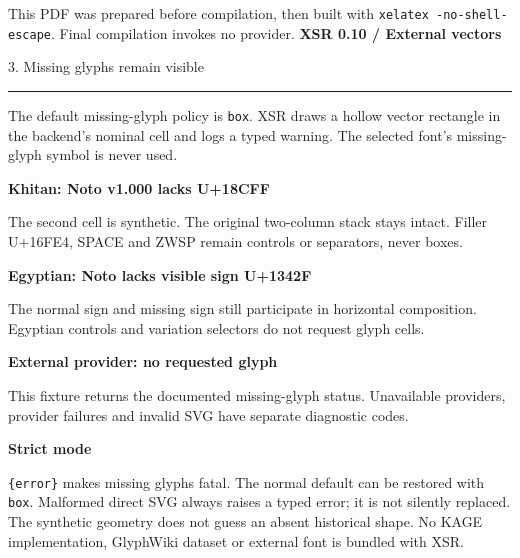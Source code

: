 \documentclass[11pt,a4paper]{article}
\newcommand\PageTitle[1]{{\color{ink}\LARGE\bfseries XSR 0.10 / External vectors}\par
  {\color{accent}\large #1}\par\medskip\hrule\medskip}
\newcommand\Sample[2]{\par\medskip\textbf{#1}\par\medskip {\fontsize{30}{40}\selectfont #2}\par\medskip}
\begin{document}
\vfill
\small This PDF was prepared before compilation, then built with
\texttt{xelatex -no-shell-escape}. Final compilation invokes no provider.
\newpage
\PageTitle{3. Missing glyphs remain visible}
The default missing-glyph policy is \texttt{box}. XSR draws a hollow vector
rectangle in the backend's nominal cell and logs a typed warning.
The selected font's missing-glyph symbol is never used.
\Sample{Khitan: Noto v1.000 lacks U+18CFF}{\xsrKhitanText{𘬁𘳿}}
The second cell is synthetic. The original two-column stack stays intact.
Filler U+16FE4, SPACE and ZWSP remain controls or separators, never boxes.
\Sample{Egyptian: Noto lacks visible sign U+1342F}{\xsrEgyptianText{𓀀𓐱𓐯}}
The normal sign and missing sign still participate in horizontal composition.
Egyptian controls and variation selectors do not request glyph cells.
\Sample{External provider: no requested glyph}{\xsrKageGlyph{missing}}
This fixture returns the documented missing-glyph status. Unavailable providers,
provider failures and invalid SVG have separate diagnostic codes.
\par\medskip
\textbf{Strict mode}\par
\texttt{\string\xsrMissingGlyphPolicy\{error\}} makes missing glyphs fatal.
The normal default can be restored with \texttt{box}. Malformed direct SVG
always raises a typed error; it is not silently replaced.
\vfill
\small The synthetic geometry does not guess an absent historical shape.
No KAGE implementation, GlyphWiki dataset or external font is bundled with XSR.
\end{document}
